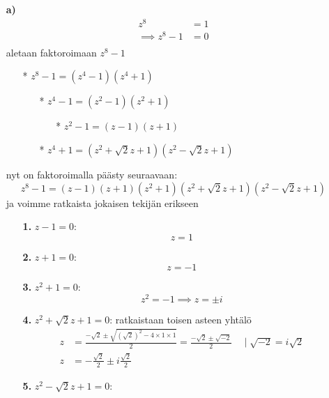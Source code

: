 \documentclass{article}
\begin{document}
\begin{itemize}
    \item[\textbf{a)}]
    \[ 
    \begin{aligned}
        z^8 &= 1\\
        \implies z^8 - 1 &= 0\\[10pt]
    \end{aligned}
    \]
    aletaan faktoroimaan $z^8 - 1$
    \begin{itemize}
        \item[*] $z^8 - 1 = (z^4 - 1)(z^4 + 1)$
        \begin{itemize}
            \item[*] $z^4 - 1 = (z^2 - 1)(z^2 + 1)$
            \begin{itemize}
                \item[*] $z^2 - 1 = (z - 1)(z + 1)$
            \end{itemize}
            \item[*] $z^4 + 1 = (z^2 + \sqrt{2}z + 1)(z^2 - \sqrt{2}z + 1)$
        \end{itemize}
    \end{itemize}
    nyt on faktoroimalla päästy seuraavaan:
    \[
    z^8 - 1 = (z - 1)(z + 1)(z^2 + 1)(z^2 + \sqrt{2}z + 1)(z^2 - \sqrt{2}z + 1)
    \]
    ja voimme ratkaista jokaisen tekijän erikseen
    \begin{itemize}
        \item [\textbf{1.}] $z - 1 = 0$:\newline
        \[
        z = 1
        \]
        \item [\textbf{2.}] $z + 1 = 0$:\newline
        \[
        z = -1
        \]
        \item [\textbf{3.}] $z^2 + 1 = 0$:
        \[
        z^2 = -1 \implies z = \pm i
        \]
        \item [\textbf{4.}] $z^2 + \sqrt{2}z + 1 = 0$:\newline
        ratkaistaan toisen asteen yhtälö
        \[
        \begin{aligned}
            z &= \frac{-\sqrt{2} \pm \sqrt{ (\sqrt{2})^2 - 4 \times 1 \times 1 }}{2} = \frac{-\sqrt{2} \pm \sqrt{-2}}{2}\quad \mid  \sqrt{-2} = i\sqrt{2}\\
            z &= -\frac{\sqrt{2}}{2} \pm i\frac{\sqrt{2}}{2}                
        \end{aligned}
        \]
        \item [\textbf{5.}] $z^2 - \sqrt{2}z + 1 = 0$:\newline

\end{itemize}
\end{itemize}
\end{document}
